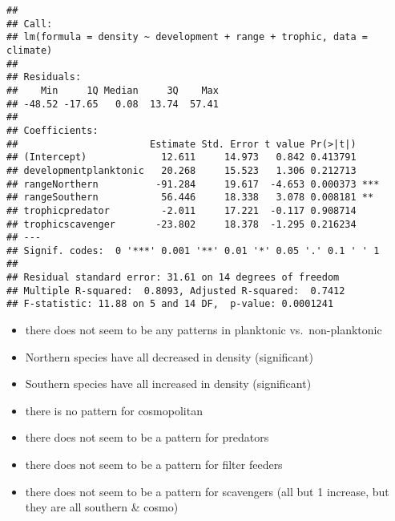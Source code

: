 \documentclass[]{article}
\newenvironment{Shaded}{\begin{snugshade}}{\end{snugshade}}
\newcommand{\CommentTok}[1]{\textcolor[rgb]{0.56,0.35,0.01}{\textit{#1}}}
\newcommand{\DataTypeTok}[1]{\textcolor[rgb]{0.13,0.29,0.53}{#1}}
\newcommand{\KeywordTok}[1]{\textcolor[rgb]{0.13,0.29,0.53}{\textbf{#1}}}
\newcommand{\NormalTok}[1]{#1}
\newcommand{\OperatorTok}[1]{\textcolor[rgb]{0.81,0.36,0.00}{\textbf{#1}}}
\newcommand{\StringTok}[1]{\textcolor[rgb]{0.31,0.60,0.02}{#1}}
\begin{document}
\begin{Shaded}
\end{Shaded}

\begin{verbatim}
## 
## Call:
## lm(formula = density ~ development + range + trophic, data = climate)
## 
## Residuals:
##    Min     1Q Median     3Q    Max 
## -48.52 -17.65   0.08  13.74  57.41 
## 
## Coefficients:
##                       Estimate Std. Error t value Pr(>|t|)    
## (Intercept)             12.611     14.973   0.842 0.413791    
## developmentplanktonic   20.268     15.523   1.306 0.212713    
## rangeNorthern          -91.284     19.617  -4.653 0.000373 ***
## rangeSouthern           56.446     18.338   3.078 0.008181 ** 
## trophicpredator         -2.011     17.221  -0.117 0.908714    
## trophicscavenger       -23.802     18.378  -1.295 0.216234    
## ---
## Signif. codes:  0 '***' 0.001 '**' 0.01 '*' 0.05 '.' 0.1 ' ' 1
## 
## Residual standard error: 31.61 on 14 degrees of freedom
## Multiple R-squared:  0.8093, Adjusted R-squared:  0.7412 
## F-statistic: 11.88 on 5 and 14 DF,  p-value: 0.0001241
\end{verbatim}

\begin{itemize}
\item
  there does not seem to be any patterns in planktonic
  vs.~non-planktonic
\item
  Northern species have all decreased in density (significant)
\item
  Southern species have all increased in density (significant)
\item
  there is no pattern for cosmopolitan
\item
  there does not seem to be a pattern for predators
\item
  there does not seem to be a pattern for filter feeders
\item
  there does not seem to be a pattern for scavengers (all but 1
  increase, but they are all southern \& cosmo)
\end{itemize}
\end{document}
